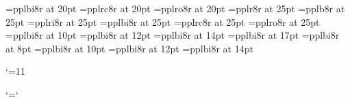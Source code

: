 \font\twtybi=pplbi8r at 20pt
\font\twtysc=pplrc8r at 20pt
\font\twtysl=pplro8r at 20pt
%
\font\twfvrm=pplr8r at 25pt
\font\twfvbf=pplb8r at 25pt
\font\twfvit=pplri8r at 25pt
\font\twfvbi=pplbi8r at 25pt
\font\twfvsc=pplrc8r at 25pt
\font\twfvsl=pplro8r at 25pt
%
\let\bigfont=\frtsc
\let\Bigfont=\svtsc
\let\BIgfont=\twtysc
\let\BIGfont=\twfvsc
%
%
\font\ppffsixteen=pplbi8r at 10pt
\font\ppfftwenty=pplbi8r at 12pt
\font\ppfftwentyfour=pplbi8r at 14pt
\font\ppfftwentynine=pplbi8r at 17pt
\font\tinyppff=pplbi8r at 8pt
\font\smallppff=pplbi8r at 10pt
\font\normppff=pplbi8r at 12pt
\font\medppff=pplbi8r at 14pt
%
\def\f{{\ppff f}}
\def\ff{{\ppff ff}}
\def\fp{{\ppff fp}}
\def\fff{{\ppff fff}}
\def\ffff{{\ppff ffff}}
\def\mf{{\ppff mf}}
\def\p{{\ppff p}}
\def\pp{{\ppff pp}}
\def\ppp{{\ppff ppp}}
\def\pppp{{\ppff pppp}}

\edef\catcodeat{\the\catcode`\@}\catcode`\@=11
%
\def\smalldyn{\let\ppff\smallppff \let\p@@f\ppff}%
\def\normdyn{\let\ppff\normppff \let\p@@f\ppff}%
\def\meddyn{\let\ppff\medppff \let\p@@f\ppff}%
%
\def\sF{{\ppff s\p@kern f}}
\def\sfz{{\ppff s\p@kern f\f@kern z}}
\def\sfzp{{\ppff s\p@kern f\f@kern z\p@kern p}}

\def\mp@{{\ppff mp}}
\let\mezzopiano\mp@
\catcode`\@=\catcodeat

\def\smalltype{%
  \let\rm\eightrm
  \let\bf\eightbf
  \let\it\eightit
  \let\bi\eightbi
  \let\sc\eightsc
  \let\sl\eightsl
  \rm}
\def\Smalltype{%
  \let\rm\ninerm
  \let\bf\ninebf
  \let\it\nineit
  \let\bi\ninebi
  \let\sc\ninesc
  \let\sl\ninesl
  \rm}
\def\normtype{%
  \let\rm\tenrm
  \let\bf\tenbf
  \let\it\tenit
  \let\bi\tenbi
  \let\sc\tensc
  \let\sl\tensl
  \rm}
\def\medtype{%
  \let\rm\twelverm
  \let\bf\twelvebf
  \let\it\twelveit
  \let\bi\twelvebi
  \let\sc\twelvesc
  \let\sl\twelvesl
  \rm}
\def\bigtype{%
  \let\rm\bigfont
  \let\bf\bigfont
  \let\it\bigfont
  \let\bi\bigfont
  \let\sc\bigfont
  \let\sl\bigfont
  \sc}
\def\Bigtype{%
  \let\rm\Bigfont
  \let\bf\Bigfont
  \let\it\Bigfont
  \let\bi\Bigfont
  \let\sc\Bigfont
  \let\sl\Bigfont
  \sc}
\def\BIgtype{%
  \let\rm\BIgfont
  \let\bf\BIgfont
  \let\it\BIgfont
  \let\bi\Bigfont
  \let\sc\Bigfont
  \let\sl\Bigfont
  \sc}
\def\BIGtype{%
  \let\rm\BIGfont
  \let\bf\BIGfont
  \let\it\BIGfont
  \let\bi\BIGfont
  \let\sc\BIGfont
  \let\sl\BIGfont
  \sc}
%


\normtype
\endinput
